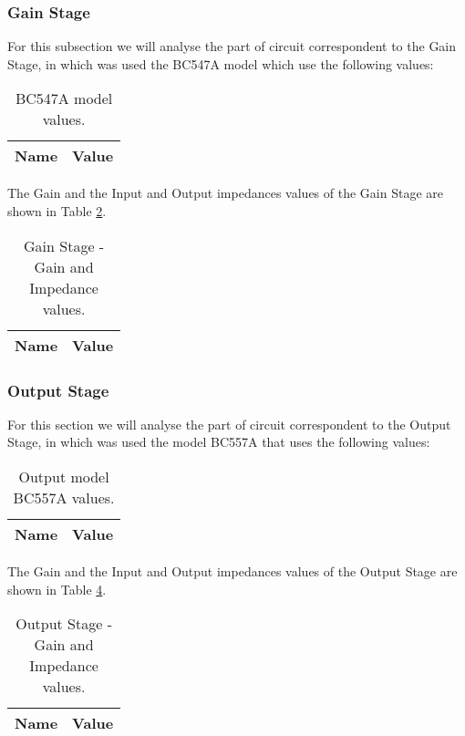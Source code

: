 \subsubsection{Gain Stage}

For this subsection we will analyse the part of circuit correspondent to the Gain Stage, in which was used the BC547A model which use the following values:

\begin{table}[H]
  \centering
  \begin{tabular}{|l|r|}
    \hline    
    {\bf Name} & {\bf Value} \\ \hline
    
  \end{tabular}
  \caption{BC547A model values.}
  \label{tab:BC547A}
\end{table}

The Gain and the Input and Output impedances values of the Gain Stage are shown in Table \ref{tab:teo_gain}.

\begin{table}[H]
	\centering
	\begin{tabular}{|l|r|}
		\hline    
		{\bf Name} & {\bf Value} \\ \hline
		
	\end{tabular}
	\caption{Gain Stage - Gain and Impedance values.}
	\label{tab:teo_gain}
\end{table}

\subsubsection{Output Stage}

For this section we will analyse the part of circuit correspondent to the Output Stage, in which was used the model BC557A that uses the following values:

\begin{table}[H]
	\centering
	\begin{tabular}{|l|r|}
		\hline    
		{\bf Name} & {\bf Value} \\ \hline
		
	\end{tabular}
	\caption{Output model BC557A values.}
	\label{tab:BC557A}
\end{table}

The Gain and the Input and Output impedances values of the Output Stage are shown in Table \ref{tab:teo_output}.

\begin{table}[H]
	\centering
	\begin{tabular}{|l|r|}
		\hline    
		{\bf Name} & {\bf Value} \\ \hline
		
	\end{tabular}
	\caption{Output Stage - Gain and Impedance values.}
	\label{tab:teo_output}
\end{table}


